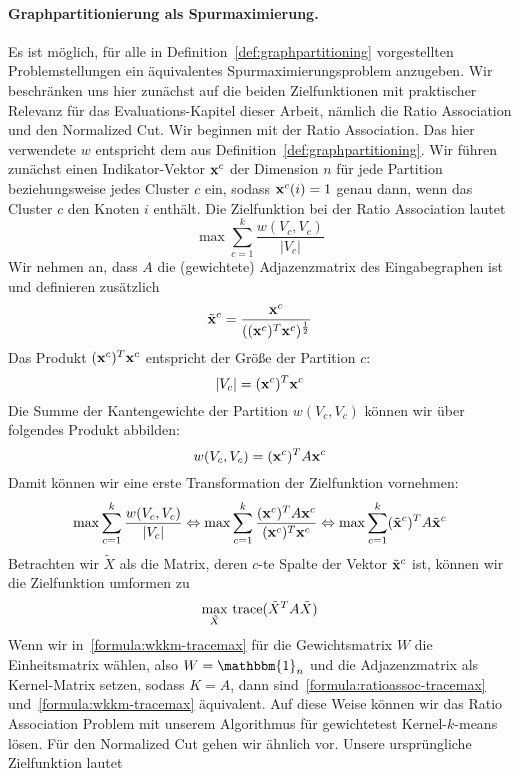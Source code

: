 \paragraph{Graphpartitionierung als Spurmaximierung.}
Es ist möglich, für alle in Definition~\ref{def:graphpartitioning} vorgestellten Problemstellungen ein äquivalentes
Spurmaximierungsproblem anzugeben. Wir beschränken uns hier zunächst auf die beiden Zielfunktionen mit praktischer Relevanz
für das Evaluations-Kapitel dieser Arbeit, nämlich die Ratio Association und den Normalized Cut. Wir beginnen mit der
Ratio As\-so\-ci\-a\-tion. Das hier verwendete $w$ entspricht dem aus Definition~\ref{def:graphpartitioning}.
Wir führen zunächst einen Indikator-Vektor $\mathbf{x}^c$ der Dimension $n$ für jede Partition beziehungsweise jedes Cluster $c$
ein, sodass $\mathbf{x}^c(i) = 1$ genau dann, wenn das Cluster $c$ den Knoten $i$ enthält. Die Zielfunktion bei der Ratio
Association lautet
\[ \max \sum_{c=1}^{k} \frac{w(V_c, V_c)}{\left|V_c\right|} \]
Wir nehmen an, dass $A$ die (gewichtete) Adjazenzmatrix des Eingabegraphen ist und definieren zusätzlich
\[ \tilde{\mathbf{x}}^c = \frac{\mathbf{x}^c}{((\mathbf{x}^c)^T \mathbf{x}^c)^\frac{1}{2}} \]
Das Produkt $(\mathbf{x}^c)^T \mathbf{x}^c$ entspricht der Größe der Partition $c$:
\[ \left|V_c\right| = (\mathbf{x}^c)^T \mathbf{x}^c \]
Die Summe der Kantengewichte der Partition $w(V_c, V_c)$ können wir über folgendes Produkt abbilden:
\[ w(V_c, V_c) = (\mathbf{x}^c)^T A \mathbf{x}^c \]
Damit können wir eine erste Transformation der Zielfunktion vornehmen:
\[ \max \sum_{c=1}^{k} \frac{w(V_c, V_c)}{\left|V_c\right|}
	\Leftrightarrow \max \sum_{c=1}^{k} \frac{(\mathbf{x}^c)^T A \mathbf{x}^c}{(\mathbf{x}^c)^T \mathbf{x}^c}
	\Leftrightarrow \max \sum_{c=1}^{k} (\tilde{\mathbf{x}}^c)^T A \tilde{\mathbf{x}}^c \]
Betrachten wir $\tilde{X}$ als die Matrix, deren $c$-te Spalte der Vektor $\tilde{\mathbf{x}}^c$ ist, können wir die Zielfunktion
umformen zu
\begin{align}
\label{formula:ratioassoc-tracemax}
	\max_{\tilde{X}}{} \operatorname*{trace}( \tilde{X}^T A \tilde{X} )
\end{align}
Wenn wir in~\ref{formula:wkkm-tracemax} für die Gewichtsmatrix $W$ die Einheitsmatrix wählen, also $W = \mathbbm{1}_n$ und
die Adjazenzmatrix als Kernel-Matrix setzen, sodass $K = A$, dann sind~\ref{formula:ratioassoc-tracemax}
und~\ref{formula:wkkm-tracemax} äquivalent. Auf diese Weise können wir das Ratio Association Problem mit unserem Algorithmus
für gewichtetest Kernel-$k$-means lösen.
\absatz
Für den Normalized Cut gehen wir ähnlich vor. Unsere ursprüngliche Zielfunktion lautet
